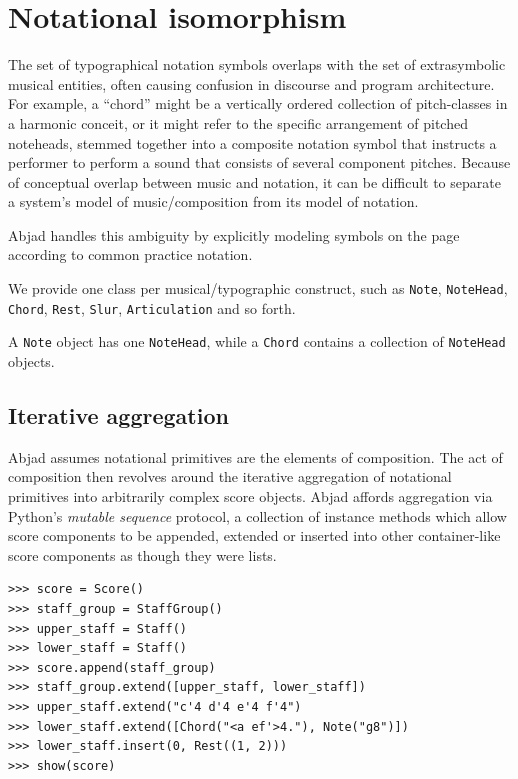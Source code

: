 \section{Notational isomorphism}\label{sec:notational_isomorphism}

The set of typographical notation symbols overlaps with the set of
extrasymbolic musical entities, often causing confusion in discourse and
program architecture. For example, a “chord” might be a vertically ordered
collection of pitch-classes in a harmonic conceit, or it might refer to the
specific arrangement of pitched noteheads, stemmed together into a composite
notation symbol that instructs a performer to perform a sound that consists of
several component pitches. Because of conceptual overlap between music and
notation, it can be difficult to separate a system’s model of music/composition
from its model of notation.

Abjad handles this ambiguity by explicitly modeling symbols on the page
according to common practice notation.

We provide one class per musical/typographic construct, such as \texttt{Note},
\texttt{NoteHead}, \texttt{Chord}, \texttt{Rest}, \texttt{Slur},
\texttt{Articulation} and so forth.

A \texttt{Note} object has one \texttt{NoteHead}, while a \texttt{Chord}
contains a collection of \texttt{NoteHead} objects.

\subsection{Iterative aggregation}

Abjad assumes notational primitives are the elements of composition. The act of
composition then revolves around the iterative aggregation of notational
primitives into arbitrarily complex score objects. Abjad affords aggregation
via Python's \emph{mutable sequence} protocol, a collection of instance methods
which allow score components to be appended, extended or inserted into other
container-like score components as though they were lists.

\begin{lstlisting}
>>> score = Score()
>>> staff_group = StaffGroup()
>>> upper_staff = Staff()
>>> lower_staff = Staff()
>>> score.append(staff_group)
>>> staff_group.extend([upper_staff, lower_staff])
>>> upper_staff.extend("c'4 d'4 e'4 f'4")
>>> lower_staff.extend([Chord("<a ef'>4."), Note("g8")])
>>> lower_staff.insert(0, Rest((1, 2)))
>>> show(score)
\end{lstlisting}

